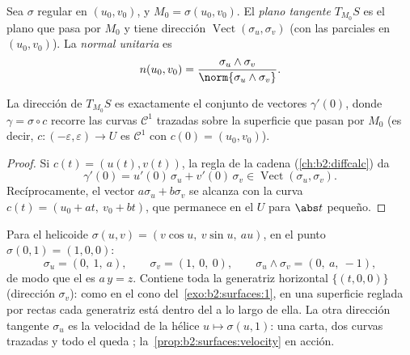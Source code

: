 \begin{definition}\label{def:b2:surfaces:tangent}
Sea $\sigma$ regular en $(u_0, v_0)$, y $M_0 = \sigma(u_0, v_0)$. El
\emph{plano tangente} $T_{M_0}S$ es el plano
que pasa por $M_0$ y tiene dirección
$\operatorname{Vect}(\sigma_u, \sigma_v)$ (con las parciales en
$(u_0, v_0)$). La \emph{normal unitaria} es
\[
n(u_0, v_0)
= \frac{\sigma_u \wedge \sigma_v}
       {\norm{\sigma_u \wedge \sigma_v}} .
\]
\end{definition}

\begin{proposition}\label{prop:b2:surfaces:velocity}
La dirección de $T_{M_0}S$ es exactamente el conjunto de vectores
$\gamma'(0)$, donde $\gamma = \sigma \circ c$ recorre las curvas
$\mathcal{C}^1$ trazadas sobre la superficie que pasan por $M_0$ (es
decir, $c \colon (-\varepsilon, \varepsilon) \to U$ es
$\mathcal{C}^1$ con $c(0) = (u_0, v_0)$).
\end{proposition}

\begin{proof}
Si $c(t) = (u(t), v(t))$, la regla de la cadena
(\cref{ch:b2:diffcalc}) da
\[
\gamma'(0) = u'(0)\,\sigma_u + v'(0)\,\sigma_v
\in \operatorname{Vect}(\sigma_u, \sigma_v).
\]
Recíprocamente, el vector $a\sigma_u + b\sigma_v$ se alcanza con la
curva $c(t) = (u_0 + at,\ v_0 + bt)$, que permanece en el  $U$
para $\abs t$ pequeño.
\end{proof}

\begin{example}
\label{ex:b2:surfaces:helicoidtangent}
Para el helicoide $\sigma(u, v) = (v\cos u,\ v\sin u,\ au)$, en el
punto $\sigma(0, 1) = (1, 0, 0)$:
\[
\sigma_u = (0,\ 1,\ a), \qquad \sigma_v = (1,\ 0,\ 0),
\qquad
\sigma_u \wedge \sigma_v = (0,\ a,\ -1),
\]
de modo que el  es $a\,y = z$. Contiene toda la
generatriz horizontal $\{(t, 0, 0)\}$ (dirección $\sigma_v$): como
en el cono del~\cref{exo:b2:surfaces:1}, en una superficie reglada por
rectas cada generatriz está dentro del  a lo largo de
ella. La otra dirección tangente $\sigma_u$ es la velocidad de la
hélice $u \mapsto \sigma(u, 1)$: una carta, dos curvas trazadas y
todo el  queda ; la~\cref{prop:b2:surfaces:velocity} en acción.
\end{example}

